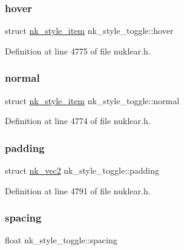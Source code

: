 \subsubsection{\texorpdfstring{hover}{hover}}
{\footnotesize\ttfamily struct \mbox{\hyperlink{structnk__style__item}{nk\+\_\+style\+\_\+item}} nk\+\_\+style\+\_\+toggle\+::hover}



Definition at line 4775 of file nuklear.\+h.

\mbox{\label{structnk__style__toggle_a4695e620bafae18faf6978d584042247}} 
\subsubsection{\texorpdfstring{normal}{normal}}
{\footnotesize\ttfamily struct \mbox{\hyperlink{structnk__style__item}{nk\+\_\+style\+\_\+item}} nk\+\_\+style\+\_\+toggle\+::normal}



Definition at line 4774 of file nuklear.\+h.

\mbox{\label{structnk__style__toggle_a0eca091d63d706e3301362592b7716a3}} 
\subsubsection{\texorpdfstring{padding}{padding}}
{\footnotesize\ttfamily struct \mbox{\hyperlink{structnk__vec2}{nk\+\_\+vec2}} nk\+\_\+style\+\_\+toggle\+::padding}



Definition at line 4791 of file nuklear.\+h.

\mbox{\label{structnk__style__toggle_af368c4c5cf5c3b1daf96ec50fb945275}} 
\subsubsection{\texorpdfstring{spacing}{spacing}}
{\footnotesize\ttfamily float nk\+\_\+style\+\_\+toggle\+::spacing}



